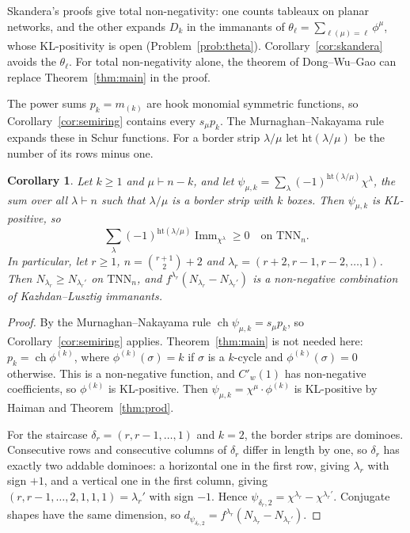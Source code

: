 \documentclass[11pt]{amsart}
\newtheorem{corollary}[theorem]{Corollary}
\theoremstyle{definition}
\theoremstyle{remark}
\newcommand{\Imm}{\operatorname{Imm}}
\newcommand{\TNN}{\mathrm{TNN}}
\newcommand{\Cp}[1]{C'_{#1}(1)}
\DeclareMathOperator{\ch}{ch}
\begin{document}
Skandera's proofs \cite{Ska25} give total non-negativity: one counts tableaux on planar networks, and the other expands $D_k$ in the immanants of $\theta_\ell=\sum_{\ell(\mu)=\ell}\phi^\mu$, whose KL-positivity is open (Problem~\ref{prob:theta}). Corollary~\ref{cor:skandera} avoids the $\theta_\ell$. For total non-negativity alone, the theorem of Dong--Wu--Gao \cite{DWG} can replace Theorem~\ref{thm:main} in the proof.

The power sums $p_k=m_{(k)}$ are hook monomial symmetric functions, so Corollary~\ref{cor:semiring} contains every $s_\mu p_k$. The Murnaghan--Nakayama rule expands these in Schur functions. For a border strip $\lambda/\mu$ let $\mathrm{ht}(\lambda/\mu)$ be the number of its rows minus one.

\begin{corollary}\label{cor:MN}
Let $k\ge1$ and $\mu\vdash n-k$, and let $\psi_{\mu,k}=\sum_\lambda(-1)^{\mathrm{ht}(\lambda/\mu)}\chi^\lambda$, the sum over all $\lambda\vdash n$ such that $\lambda/\mu$ is a border strip with $k$ boxes. Then $\psi_{\mu,k}$ is KL-positive, so
\[
\sum_\lambda(-1)^{\mathrm{ht}(\lambda/\mu)}\Imm_{\chi^\lambda}\ge0\quad\text{on }\TNN_n.
\]
In particular, let $r\ge1$, $n=\binom{r+1}2+2$ and $\lambda_r=(r+2,r-1,r-2,\dots,1)$. Then $N_{\lambda_r}\ge N_{\lambda_r'}$ on $\TNN_n$, and $f^{\lambda_r}(N_{\lambda_r}-N_{\lambda_r'})$ is a non-negative combination of Kazhdan--Lusztig immanants.
\end{corollary}

\begin{proof}
By the Murnaghan--Nakayama rule $\ch\psi_{\mu,k}=s_\mu p_k$, so Corollary~\ref{cor:semiring} applies. Theorem~\ref{thm:main} is not needed here: $p_k=\ch\phi^{(k)}$, where $\phi^{(k)}(\sigma)=k$ if $\sigma$ is a $k$-cycle and $\phi^{(k)}(\sigma)=0$ otherwise. This is a non-negative function, and $\Cp w$ has non-negative coefficients, so $\phi^{(k)}$ is KL-positive. Then $\psi_{\mu,k}=\chi^\mu\cdot\phi^{(k)}$ is KL-positive by Haiman \cite[Lemma~1.1]{Hai} and Theorem~\ref{thm:prod}.

For the staircase $\delta_r=(r,r-1,\dots,1)$ and $k=2$, the border strips are dominoes. Consecutive rows and consecutive columns of $\delta_r$ differ in length by one, so $\delta_r$ has exactly two addable dominoes: a horizontal one in the first row, giving $\lambda_r$ with sign $+1$, and a vertical one in the first column, giving $(r,r-1,\dots,2,1,1,1)=\lambda_r'$ with sign $-1$. Hence $\psi_{\delta_r,2}=\chi^{\lambda_r}-\chi^{\lambda_r'}$. Conjugate shapes have the same dimension, so $d_{\psi_{\delta_r,2}}=f^{\lambda_r}(N_{\lambda_r}-N_{\lambda_r'})$.
\end{proof}
\end{document}
